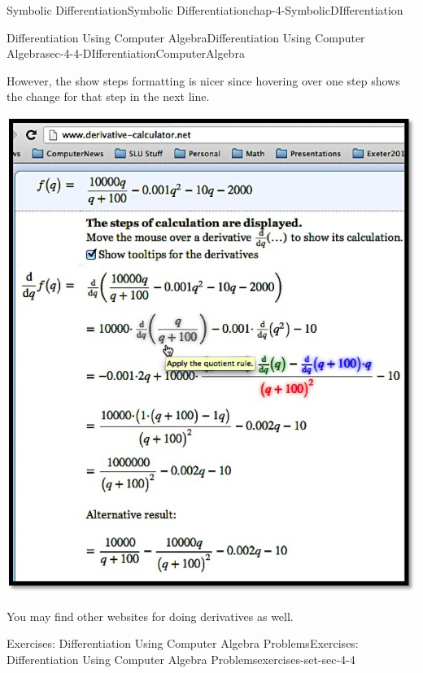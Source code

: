 \documentclass[oneside,10pt,]{book}
\numberwithin{equation}{section}
\begin{document}
\begin{chapterptx}{Symbolic Differentiation}{}{Symbolic Differentiation}{}{}{chap-4-SymbolicDIfferentiation}
\begin{sectionptx}{Differentiation Using Computer Algebra}{}{Differentiation Using Computer Algebra}{}{}{sec-4-4-DIfferentiationComputerAlgebra}
\begin{sidebyside}{1}{0.05}{0.05}{0}
\begin{sbspanel}{0.9}
\end{sbspanel}%
\end{sidebyside}%
\par
\hypertarget{p-1738}{}%
However, the show steps formatting is nicer since hovering over one step shows the change for that step in the next line.%
\begin{sidebyside}{1}{0.15}{0.15}{0}%
\begin{sbspanel}{0.7}%
\includegraphics[width=1\linewidth]{images/sec4-4-10.png}
\end{sbspanel}%
\end{sidebyside}%
\par
\hypertarget{p-1739}{}%
You may find other websites for doing derivatives as well.%
%
%
\typeout{************************************************}
\typeout{************************************************}
%
\begin{exercises-subsection-numberless}{Exercises: Differentiation Using Computer Algebra Problems}{}{Exercises: Differentiation Using Computer Algebra Problems}{}{}{exercises-set-sec-4-4}
\hypertarget{p-1740}{}%

\end{exercises-subsection-numberless}
\end{sectionptx}
\end{chapterptx}
\end{document}
